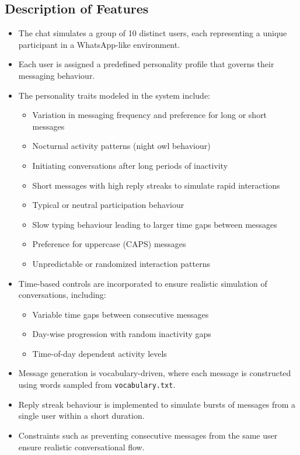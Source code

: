 \documentclass[11pt,a4paper]{article}
\begin{document}
\subsection{Description of Features}
\begin{itemize}
    \item The chat simulates a group of 10 distinct users, each representing a unique participant in a WhatsApp-like environment.
    
    \item Each user is assigned a predefined personality profile that governs their messaging behaviour.
    
    \item The personality traits modeled in the system include:
    \begin{itemize}
        \item Variation in messaging frequency and preference for long or short messages
        \item Nocturnal activity patterns (night owl behaviour)
        \item Initiating conversations after long periods of inactivity
        \item Short messages with high reply streaks to simulate rapid interactions
        \item Typical or neutral participation behaviour
        \item Slow typing behaviour leading to larger time gaps between messages
        \item Preference for uppercase (CAPS) messages
        \item Unpredictable or randomized interaction patterns
    \end{itemize}
    
    \item Time-based controls are incorporated to ensure realistic simulation of conversations, including:
    \begin{itemize}
        \item Variable time gaps between consecutive messages
        \item Day-wise progression with random inactivity gaps
        \item Time-of-day dependent activity levels
    \end{itemize}
    
    \item Message generation is vocabulary-driven, where each message is constructed using words sampled from \texttt{vocabulary.txt}.
    
    \item Reply streak behaviour is implemented to simulate bursts of messages from a single user within a short duration.
    
    \item Constraints such as preventing consecutive messages from the same user ensure realistic conversational flow.
\end{itemize}
\end{document}
